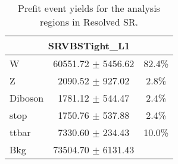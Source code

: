 \begin{table}
\caption{Prefit event yields for the analysis regions in \olep Resolved SR.}
\label{tab:PrefitYield_1lepResSR_Per}
\begin{center}
\begin{tabular}{|l|c|c|}
\hline
\multicolumn{3}{|c|}{SRVBSTight\_L1}\\ \hline
W & 60551.72 $\pm$ 5456.62 & 82.4\% \\
Z & 2090.52 $\pm$ 927.02 & 2.8\% \\
Diboson & 1781.12 $\pm$ 544.47 & 2.4\% \\
stop & 1750.76 $\pm$ 537.88 & 2.4\% \\
ttbar & 7330.60 $\pm$ 234.43 & 10.0\% \\
\hline
Bkg & 73504.70 $\pm$ 6131.43 & \\
\hline
\end{tabular}
\end{center}
\end{table}


